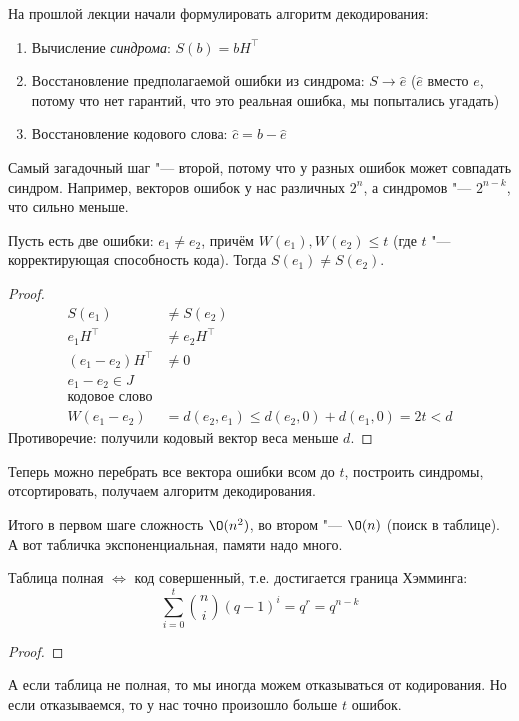 На прошлой лекции начали формулировать алгоритм декодирования:

\begin{enumerate}
\item
	Вычисление \textit{синдрома}: $S(b)=bH^\top$
\item
	Восстановление предполагаемой ошибки из синдрома: $S \to \hat e$
	($\hat e$ вместо $e$, потому что нет гарантий, что это
	реальная ошибка, мы попытались угадать)
\item
	Восстановление кодового слова: $\hat c = b - \hat e$
\end{enumerate}

Самый загадочный шаг "--- второй, потому что у разных ошибок может совпадать синдром.
Например, векторов ошибок у нас различных $2^n$, а синдромов "--- $2^{n-k}$, что сильно меньше.

\begin{theorem}
	Пусть есть две ошибки: $e_1\neq e_2$, причём
	$W(e_1), W(e_2) \le t$ (где $t$ "--- корректирующая способность кода).
	Тогда $S(e_1) \neq S(e_2)$.
\end{theorem}
\begin{proof}
	\begin{align*}
	S(e_1) &\neq S(e_2) \\
	e_1H^\top &\neq e_2H^\top \\
	(e_1-e_2)H^\top &\neq 0 \\
	e_1 - e_2 \in J \\ \text{кодовое слово} \\
	W(e_1 - e_2) &= d(e_2, e_1) \le d(e_2, 0) + d(e_1, 0) = 2t < d
	\end{align*}
	Противоречие: получили кодовый вектор веса меньше $d$.
\end{proof}

Теперь можно перебрать все вектора ошибки всом до $t$,
построить синдромы, отсортировать, получаем алгоритм декодирования.

Итого в первом шаге сложность $\O(n^2)$, во втором "--- $\O(n)$ (поиск в таблице).
А вот табличка экспоненциальная, памяти надо много.

\begin{Rem}
	Таблица полная $\iff$ код совершенный,
	т.е. достигается граница Хэмминга:
	\[
		\sum_{i=0}^t \binom{n}{i} (q-1)^i = q^r = q^{n-k}
	\]
\end{Rem}
\begin{proof}
	\TODO
\end{proof}
\begin{Rem}
	А если таблица не полная, то мы иногда можем отказываться
	от кодирования.
	Но если отказываемся, то у нас точно произошло больше $t$ ошибок.
\end{Rem}

